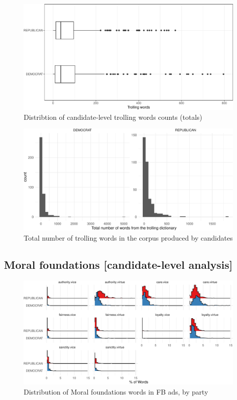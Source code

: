 \documentclass[
  12pt,
]{article}
\begin{document}
\begin{figure}
\centering
\includegraphics{figsFB/unnamed-chunk-19-1.pdf}
\caption{\label{fig:unnamed-chunk-19}Distribtion of candidate-level trolling words counts (totals)}
\end{figure}

\begin{figure}
\centering
\includegraphics{figsFB/unnamed-chunk-20-1.pdf}
\caption{\label{fig:unnamed-chunk-20}Total number of trolling words in the corpus produced by candidates}
\end{figure}

\clearpage
\pagebreak

\hypertarget{moral-foundations-candidate-level-analysis}{%
\subsection{Moral foundations {[}candidate-level analysis{]}}\label{moral-foundations-candidate-level-analysis}}

\begin{figure}
\centering
\includegraphics{figsFB/unnamed-chunk-21-1.pdf}
\caption{\label{fig:unnamed-chunk-21}Distribution of Moral foundations words in FB ads, by party}
\end{figure}
\end{document}
